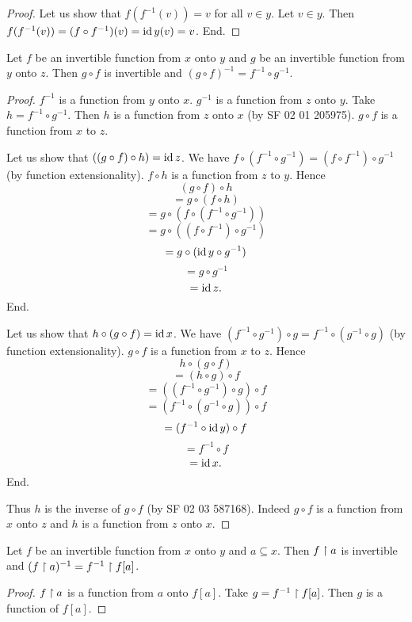 \documentclass[../../sets-and-functions.ftl.tex]{subfiles}
\begin{document}
\begin{forthel}
\begin{proof}
      Let us show that $f(f^{-1}(v)) = v$ for all $v \in y$.
        Let $v \in y$.
        Then $f(f^{-1}(v)) = (f \circ f^{-1})(v) = \operatorname{id}{y}(v) = v$.
      End.
    \end{proof}

    \begin{proposition}[SF 02 03 430030]
      Let $f$ be an invertible function from $x$ onto $y$ and $g$ be an invertible function from $y$ onto $z$.
      Then $g \circ f$ is invertible and $(g \circ f)^{-1} = f^{-1} \circ g^{-1}$.
    \end{proposition}
    \begin{proof}
      $f^{-1}$ is a function from $y$ onto $x$.
      $g^{-1}$ is a function from $z$ onto $y$.
      Take $h = f^{-1} \circ g^{-1}$.
      Then $h$ is a function from $z$ onto $x$ (by SF 02 01 205975).
      $g \circ f$ is a function from $x$ to $z$.

      Let us show that $((g \circ f) \circ h) = \operatorname{id}{z}$.
        We have $f \circ (f^{-1} \circ g^{-1}) = (f \circ f^{-1}) \circ g^{-1}$ (by function extensionality).
        $f \circ h$ is a function from $z$ to $y$.
        Hence
        \[   (g \circ f) \circ h \]
        \[ = g \circ (f \circ h) \]
        \[ = g \circ (f \circ (f^{-1} \circ g^{-1})) \]
        \[ = g \circ ((f \circ f^{-1}) \circ g^{-1}) \]
        \[ = g \circ (\operatorname{id}{y} \circ g^{-1}) \]
        \[ = g \circ g^{-1} \]
        \[ = \operatorname{id}{z}. \]
      End.

      Let us show that $h \circ (g \circ f) = \operatorname{id}{x}$.
        We have $(f^{-1} \circ g^{-1}) \circ g = f^{-1} \circ (g^{-1} \circ g)$ (by function extensionality).
        $g \circ f$ is a function from $x$ to $z$.
        Hence
        \[   h \circ (g \circ f) \]
        \[ = (h \circ g) \circ f \]
        \[ = ((f^{-1} \circ g^{-1}) \circ g) \circ f \]
        \[ = (f^{-1} \circ (g^{-1} \circ g)) \circ f \]
        \[ = (f^{-1} \circ \operatorname{id}{y}) \circ f \]
        \[ = f^{-1} \circ f \]
        \[ = \operatorname{id}{x}. \]
      End.

      Thus $h$ is the inverse of $g \circ f$ (by SF 02 03 587168).
      Indeed $g \circ f$ is a function from $x$ onto $z$ and $h$ is a function from $z$ onto $x$.
    \end{proof}

    \begin{proposition}[SF 02 03 908585]
      Let $f$ be an invertible function from $x$ onto $y$ and $a \subseteq x$.
      Then $f \upharpoonright a$ is invertible and $(f\upharpoonright a)^{-1} = f^{-1} \upharpoonright f[a]$.
    \end{proposition}
    \begin{proof}
      $f \upharpoonright a$ is a function from $a$ onto $f[a]$.
      Take $g = f^{-1} \upharpoonright f[a]$.
      Then $g$ is a function of $f[a]$.


\end{proof}
\end{forthel}
\end{document}
